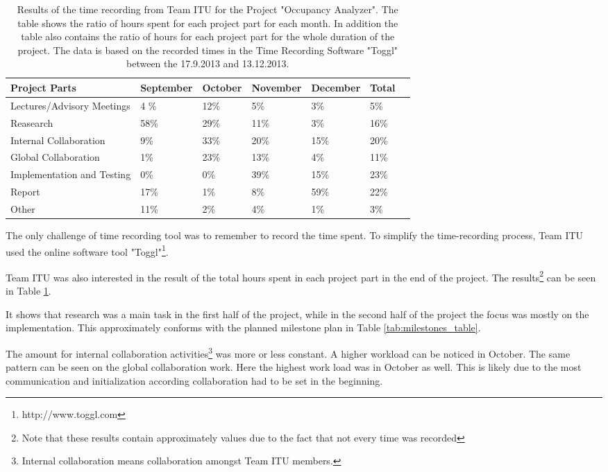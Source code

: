 \begin{table}[htb]
	\centering
	\begin{tabular}{ |  p{} |  p{2cm} |  p{2cm} |  p{2cm} |  p{2cm} |  p{2cm} |  p{2cm}|}
    		\hline
   		Project Parts & September & October & November & December & Total\\ \hline
    		Lectures/Advisory Meetings & 4 \% & 12\% & 5\% & 3\% & 5\% \\ \hline
    		Reasearch & 58\% & 29\% & 11\% & 3\% & 16\% \\ \hline
		Internal Collaboration & 9\% & 33\% & 20\% & 15\% & 20\%\\ \hline
    		Global Collaboration & 1\% & 23\% & 13\% & 4\% & 11\%\\ \hline
    		Implementation and Testing & 0\% & 0\% & 39\% & 15\% & 23\% \\ \hline
    		Report & 17\% & 1\%  & 8\% & 59\% & 22\% \\ \hline
 		Other & 11\% & 2\% & 4\% & 1\% & 3\%\\ \hline
	\end{tabular}
	\caption{Results of the time recording from Team ITU for the Project "Occupancy Analyzer". The table shows the ratio of hours spent for each project part for each month. In addition the table also contains the ratio of hours for each project part for the whole duration of the project. The data is based on the recorded times in the Time Recording Software "Toggl" between the 17.9.2013 and 13.12.2013.}
	\label{tab:timeRecResults}
\end{table}

The only challenge of time recording tool was to remember to record the time spent. To simplify the time-recording process, Team ITU used the online software tool "Toggl"\footnote{http://www.toggl.com}.

Team ITU was also interested in the result of the total hours spent in each project part in the end of the project. The results\footnote{Note that these results contain approximately values due to the fact that not every time was recorded} can be seen in Table \ref{tab:timeRecResults}.

It shows that research was a main task in the first half of the project, while in the second half of the project the focus was mostly on the implementation. This approximately conforms with the planned milestone plan in Table \ref{tab:milestones_table}.

The amount for internal collaboration activities\footnote{Internal collaboration means collaboration amongst Team ITU members.} was more or less constant. A higher workload can be noticed in October. The same pattern can be seen on the global collaboration work. Here the highest work load was in October as well. This is likely due to the most communication and initialization according collaboration had to be set in the beginning.

